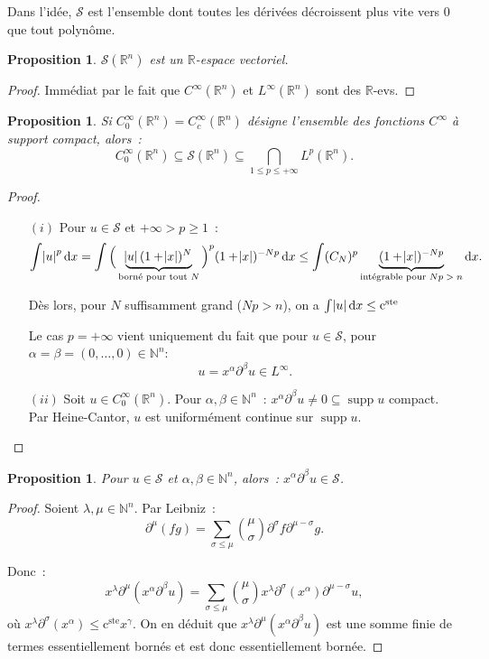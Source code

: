 \documentclass{report}
\DeclareMathOperator{\supp}{supp}
\newcommand{\R}{{\mathbb R}}
\newcommand{\N}{{\mathbb N}}
\newcommand{\pinfty}{{+\infty}}
\newcommand{\cste}{\text{c}^{\text{ste}}}
\newtheorem{prp}[thm]{Proposition}
\theoremstyle{definition}
\theoremstyle{remark}
\begin{document}
Dans l'idée, $\mathcal S$ est l'ensemble dont toutes les dérivées décroissent plus vite vers 0 que tout polynôme.

\begin{prp} $\mathcal S(\R^n)$ est un $\R$-espace vectoriel.
\end{prp}

\begin{proof} Immédiat par le fait que $C^\infty(\R^n)$ et $L^\infty(\R^n)$ sont des $\R$-evs.
\end{proof}

\begin{prp}\label{prp:C^infty_0 dans Schartz dans l'intersection des L^p} Si $C^\infty_0(\R^n) = C^\infty_c(\R^n)$ désigne l'ensemble des fonctions $C^\infty$ à support compact, alors~:
\[C^\infty_0(\R^n) \subseteq \mathcal S(\R^n) \subseteq \bigcap_{1 \leq p \leq \pinfty} L^p(\R^n).\]
\end{prp}

\begin{proof}~
\begin{itemize}
	\item[$(i)$] Pour $u \in \mathcal S$ et $\pinfty > p \geq 1$~:
	\[\int \abs u^p\dif x = \int \Big(\underbrace{\abs u(1+\abs x)^N}_{\text{borné pour tout $N$}}\Big)^p(1+\abs x)^{-Np}\dif x
		\leq \int (C_N)^p\underbrace {(1+\abs x)^{-Np}}_{\text{intégrable pour $Np > n$}}\dif x.\]

	Dès lors, pour $N$ suffisamment grand ($Np>n$), on a $\int \abs u\dif x \leq \cste$

	Le cas $p = \pinfty$ vient uniquement du fait que pour $u \in \mathcal S$, pour $\alpha = \beta = (0, \ldots, 0) \in \N^n$:
	\[u = x^\alpha\partial^\beta u \in L^\infty.\]

	\item[$(ii)$] Soit $u \in C^\infty_0(\R^n)$. Pour $\alpha, \beta \in \N^n$~: $x^\alpha\partial^\beta u \neq 0 \subseteq \supp u$ compact. Par Heine-Cantor,
	$u$ est uniformément continue sur $\supp u$.
\end{itemize}
\end{proof}

\begin{prp} Pour $u \in \mathcal S$ et $\alpha, \beta \in \N^n$, alors~: $x^\alpha\partial^\beta u \in \mathcal S$.
\end{prp}

\begin{proof} Soient $\lambda, \mu \in \N^n$. Par Leibniz~:
\[\partial^\mu(fg) = \sum_{\sigma \leq \mu}\binom \mu\sigma\partial^\sigma f \partial^{\mu-\sigma} g.\]

Donc~:
\[x^\lambda\partial^\mu(x^\alpha\partial^\beta u) = \sum_{\sigma \leq \mu}\binom \mu\sigma x^\lambda\partial^\sigma(x^\alpha)\partial^{\mu-\sigma}u,\]
où $x^\lambda\partial^\sigma(x^\alpha) \leq \cste x^\gamma$. On en déduit que $x^\lambda\partial^\mu(x^\alpha\partial^\beta u)$ est une somme finie de termes
essentiellement bornés et est donc essentiellement bornée.
\end{proof}
\end{document}
